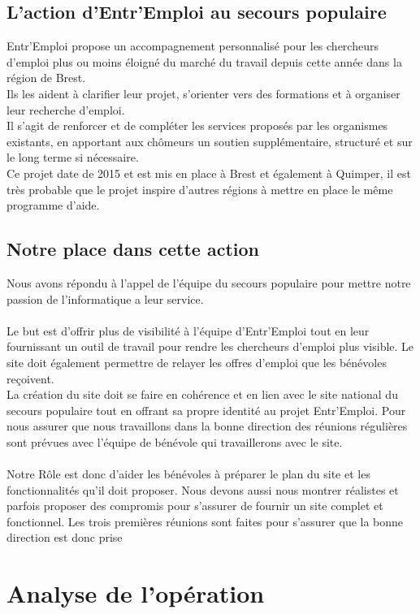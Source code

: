 \documentclass[a4paper, 12pt]{report}
\begin{document}
\section{L'action d'Entr'Emploi au secours populaire}
Entr'Emploi propose un accompagnement personnalisé pour les chercheurs d'emploi plus ou moins éloigné du marché du travail depuis cette année dans la région de Brest.\\
Ils les aident à clarifier leur projet, s'orienter vers des formations et à organiser leur recherche d'emploi.\\
Il s'agit de renforcer et de compléter les services proposés par les organismes existants, en apportant aux chômeurs un soutien supplémentaire, structuré et sur le long terme si nécessaire.\\
Ce projet date de 2015 et est mis en place à Brest et également à Quimper, il est très probable que le projet inspire d'autres régions à mettre en place le même programme d'aide.
\section{Notre place dans cette action}
Nous avons répondu à l'appel de l'équipe du secours populaire pour mettre notre passion de l'informatique a leur service.\\
\\
Le but est d'offrir plus de visibilité à l'équipe d'Entr'Emploi tout en leur fournissant un outil de travail pour rendre les chercheurs d'emploi plus visible. Le site doit également permettre de relayer les offres d'emploi que les bénévoles reçoivent.\\
La création du site doit se faire en cohérence et en lien avec le site national du secours populaire tout en offrant sa propre identité au projet Entr'Emploi. Pour nous assurer que nous travaillons dans la bonne direction des réunions régulières sont prévues avec l'équipe de bénévole qui travaillerons avec le site.\\
\\
Notre Rôle est donc d'aider les bénévoles à préparer le plan du site et les fonctionnalités qu'il doit proposer. Nous devons aussi nous montrer réalistes et parfois proposer des compromis pour s'assurer de fournir un site complet et fonctionnel. Les trois premières réunions sont faites pour s'assurer que la bonne direction est donc prise\\

\chapter{Analyse de l’opération}
\thispagestyle{fancy}
\end{document}
